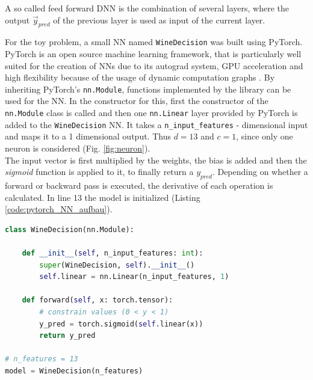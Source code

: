 A so called feed forward DNN is the combination of several layers, where the output $\vec{y}_{pred}$ of the previous layer is used as input of the current layer.

For the toy problem, a small NN named \texttt{WineDecision} was built using PyTorch. PyTorch is an open source machine learning framework, that is particularly well suited for the creation of NNs due to its autograd system, GPU acceleration and high flexibility because of the usage of dynamic computation graphs \cite{Paszke2019Dec}. By inheriting PyTorch's \texttt{nn.Module}, functions implemented by the library can be used for the NN. In the constructor for this, first the constructor of the \texttt{nn.Module} class is called and then one \texttt{nn.Linear} layer provided by PyTorch is added to the \texttt{WineDecision} NN. It takes a \texttt{n\_input\_features} - dimensional input and maps it to a 1 dimensional output. Thus $d=13$ and $c=1$, since only one neuron is considered (Fig. \ref{fig:neuron}).\\
The input vector is first multiplied by the weights, the bias is added and then the \textit{sigmoid} function is applied to it, to finally return a $y_{pred}$. Depending on whether a forward or backward pass is executed, the derivative of each operation is calculated. In line 13 the model is initialized (Listing \ref{code:pytorch_NN_aufbau}).
\begin{lstlisting}[float, language=python, caption={Structure of one layer neural network with PyTorch.}, label=code:pytorch_NN_aufbau]
class WineDecision(nn.Module):

    def __init__(self, n_input_features: int):
        super(WineDecision, self).__init__()
        self.linear = nn.Linear(n_input_features, 1)

    def forward(self, x: torch.tensor):
        # constrain values (0 < y < 1)
        y_pred = torch.sigmoid(self.linear(x))
        return y_pred

# n_features = 13
model = WineDecision(n_features)
\end{lstlisting}
